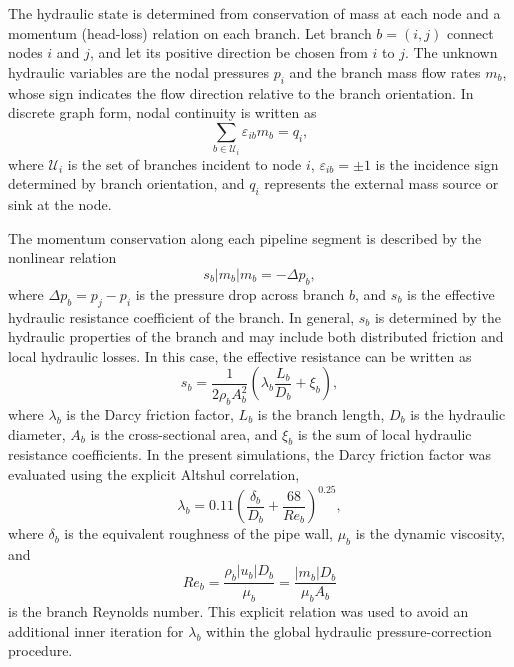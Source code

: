 \documentclass[energies,article,submit,pdftex,moreauthors]{Definitions/mdpi}
\begin{document}
The hydraulic state is determined from conservation of mass at each node and a
momentum (head-loss) relation on each branch. Let branch $b=(i,j)$ connect
nodes $i$ and $j$, and let its positive direction be chosen from $i$ to $j$.
The unknown hydraulic variables are the nodal pressures $p_i$ and the branch
mass flow rates $m_b$, whose sign indicates the flow direction relative to the
branch orientation. In discrete graph form, nodal continuity is written as
\begin{equation}
	\sum_{b \in \mathcal{U}_i} \varepsilon_{ib} m_b = q_i,
\end{equation}
where $\mathcal{U}_i$ is the set of branches incident to node $i$, $\varepsilon_{ib}=\pm 1$
is the incidence sign determined by branch orientation, and $q_i$ represents the
external mass source or sink at the node.

The momentum conservation along each pipeline segment is described by the
nonlinear relation
\begin{equation}
	s_b |m_b| m_b = -\Delta p_b,
\end{equation}
where $\Delta p_b = p_j - p_i$ is the pressure drop across branch $b$, and $s_b$ is the
effective hydraulic resistance coefficient of the branch. In general, $s_b$ is determined
by the hydraulic properties of the branch and may include both distributed friction and
local hydraulic losses. In this case, the effective resistance can be written as
\begin{equation}
	s_b =
	\frac{1}{2 \rho_b A_b^2}
	\left(
	\lambda_b \frac{L_b}{D_b} + \xi_b
	\right),
\end{equation}
where $\lambda_b$ is the Darcy friction factor, $L_b$ is the branch length, $D_b$ is the
hydraulic diameter, $A_b$ is the cross-sectional area, and $\xi_b$ is the sum of local
hydraulic resistance coefficients.
In the present simulations, the Darcy friction factor was evaluated using the explicit
Altshul correlation,
\begin{equation}
	\lambda_b =
	0.11\left(
	\frac{\delta_b}{D_b}+\frac{68}{Re_b}
	\right)^{0.25},
\end{equation}
where $\delta_b$ is the equivalent roughness of the pipe wall, $\mu_b$ is the dynamic
viscosity, and
\begin{equation}
	Re_b = \frac{\rho_b |u_b| D_b}{\mu_b}
	= \frac{|m_b|D_b}{\mu_b A_b}
\end{equation}
is the branch Reynolds number. This explicit relation was used to avoid an additional
inner iteration for $\lambda_b$ within the global hydraulic pressure-correction procedure.
\end{document}
